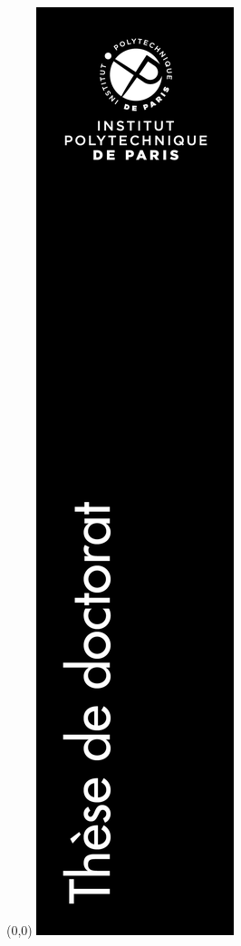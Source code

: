 \thispagestyle{empty}

\color{black} \hfill \vfill \tiny \ecodocnum
\begin{textblock}{4.5}(0,0)
	\includegraphics [scale=0.8]{media/bande.png}
	\vspace{300mm}
\end{textblock}


